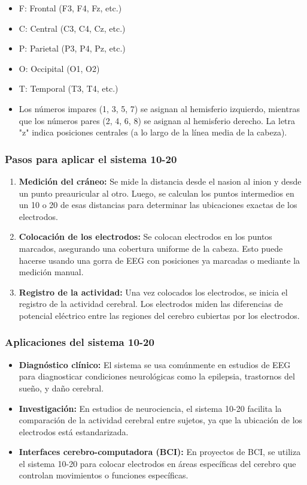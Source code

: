 \documentclass{article}
\begin{document}
\begin{itemize}
    \item F: Frontal (F3, F4, Fz, etc.)
    \item C: Central (C3, C4, Cz, etc.)
    \item P: Parietal (P3, P4, Pz, etc.)
    \item O: Occipital (O1, O2)
    \item T: Temporal (T3, T4, etc.)
    \item Los números impares (1, 3, 5, 7) se asignan al hemisferio izquierdo, mientras que los números pares (2, 4, 6, 8) se asignan al hemisferio derecho. La letra "z" indica posiciones centrales (a lo largo de la línea media de la cabeza).
\end{itemize}

\subsubsection{Pasos para aplicar el sistema 10-20}

\begin{enumerate}

    \item \textbf{Medición del cráneo:} Se mide la distancia desde el nasion al inion y desde un punto preauricular al otro. Luego, se calculan los puntos intermedios en un 10 o 20 de esas distancias para determinar las ubicaciones exactas de los electrodos.
    
    \item \textbf{Colocación de los electrodos:} Se colocan electrodos en los puntos marcados, asegurando una cobertura uniforme de la cabeza. Esto puede hacerse usando una gorra de EEG con posiciones ya marcadas o mediante la medición manual.
    
    \item \textbf{Registro de la actividad:} Una vez colocados los electrodos, se inicia el registro de la actividad cerebral. Los electrodos miden las diferencias de potencial eléctrico entre las regiones del cerebro cubiertas por los electrodos.
\end{enumerate}

\subsubsection{Aplicaciones del sistema 10-20}
\begin{itemize}
    \item \textbf{Diagnóstico clínico:} El sistema se usa comúnmente en estudios de EEG para diagnosticar condiciones neurológicas como la epilepsia, trastornos del sueño, y daño cerebral.
    \item \textbf{Investigación:} En estudios de neurociencia, el sistema 10-20 facilita la comparación de la actividad cerebral entre sujetos, ya que la ubicación de los electrodos está estandarizada.
    \item \textbf{Interfaces cerebro-computadora (BCI):} En proyectos de BCI, se utiliza el sistema 10-20 para colocar electrodos en áreas específicas del cerebro que controlan movimientos o funciones específicas.
\end{itemize}
\end{document}
